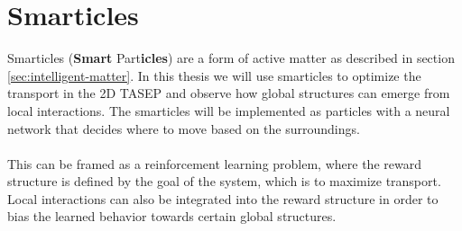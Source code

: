 \section{Smarticles}
\label{sec:smarticles}
Smarticles (\textbf{Smart} Part\textbf{icles}) are a form of active matter as described in section \ref{sec:intelligent-matter}. In this thesis we will use smarticles to optimize the transport in the 2D TASEP and observe how global structures can emerge from local interactions. The smarticles will be implemented as particles with a neural network that decides where to move based on the surroundings. 
\\
\\
This can be framed as a reinforcement learning problem, where the reward structure is defined by the goal of the system, which is to maximize transport. Local interactions can also be integrated into the reward structure in order to bias the learned behavior towards certain global structures.  